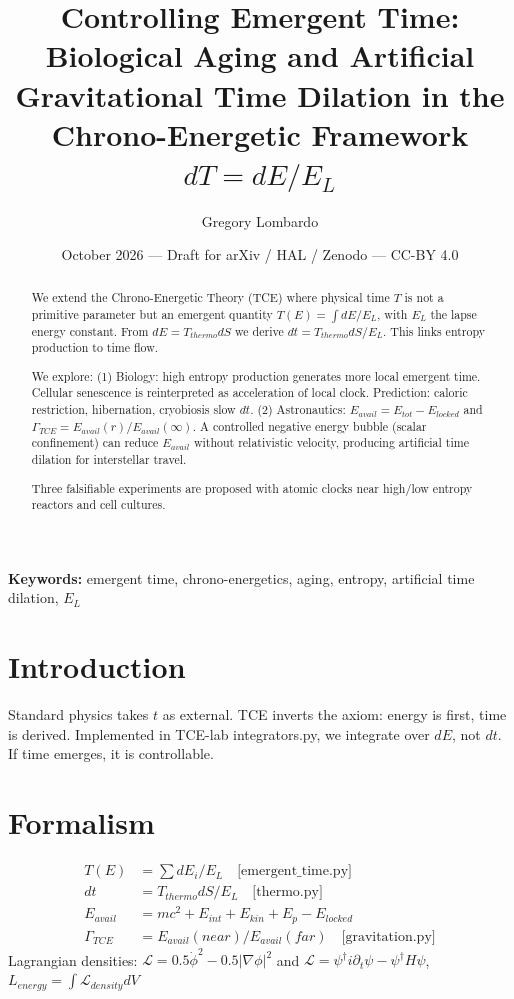 \documentclass[11pt,a4paper]{article}
\title{Controlling Emergent Time: Biological Aging and Artificial Gravitational Time Dilation in the Chrono-Energetic Framework $dT = dE / E_L$}
\author{Gregory Lombardo}
\affil{TCE-lab, Independent Researcher, Antibes, France}
\date{October 2026 — Draft for arXiv / HAL / Zenodo — CC-BY 4.0}
\begin{document}
\maketitle

\begin{abstract}
We extend the Chrono-Energetic Theory (TCE) where physical time $T$ is not a primitive parameter but an emergent quantity $T(E) = \int dE / E_L$, with $E_L$ the lapse energy constant. From $dE = T_{thermo} dS$ we derive $dt = T_{thermo} dS / E_L$. This links entropy production to time flow.

We explore: (1) Biology: high entropy production generates more local emergent time. Cellular senescence is reinterpreted as acceleration of local clock. Prediction: caloric restriction, hibernation, cryobiosis slow $dt$. (2) Astronautics: $E_{avail}=E_{tot}-E_{locked}$ and $\Gamma_{TCE}=E_{avail}(r)/E_{avail}(\infty)$. A controlled negative energy bubble (scalar confinement) can reduce $E_{avail}$ without relativistic velocity, producing artificial time dilation for interstellar travel.

Three falsifiable experiments are proposed with atomic clocks near high/low entropy reactors and cell cultures.
\end{abstract}

\noindent\textbf{Keywords:} emergent time, chrono-energetics, aging, entropy, artificial time dilation, $E_L$

\section{Introduction}
Standard physics takes $t$ as external. TCE inverts the axiom: energy is first, time is derived. Implemented in TCE-lab integrators.py, we integrate over $dE$, not $dt$. If time emerges, it is controllable.

\section{Formalism}
\begin{align}
T(E) &= \sum dE_i / E_L \quad \text{[emergent\_time.py]}\\
dt &= T_{thermo} dS / E_L \quad \text{[thermo.py]}\\
E_{avail} &= mc^2 + E_{int} + E_{kin} + E_p - E_{locked}\\
\Gamma_{TCE} &= E_{avail}(near)/E_{avail}(far) \quad \text{[gravitation.py]}
\end{align}
Lagrangian densities: $ \mathcal{L}=0.5 \dot\phi^2 -0.5 |\nabla\phi|^2$ and $\mathcal{L}= \psi^\dagger i\partial_t \psi - \psi^\dagger H \psi$, $L_{energy}=\int \mathcal{L}_{density} dV$
\end{document}
